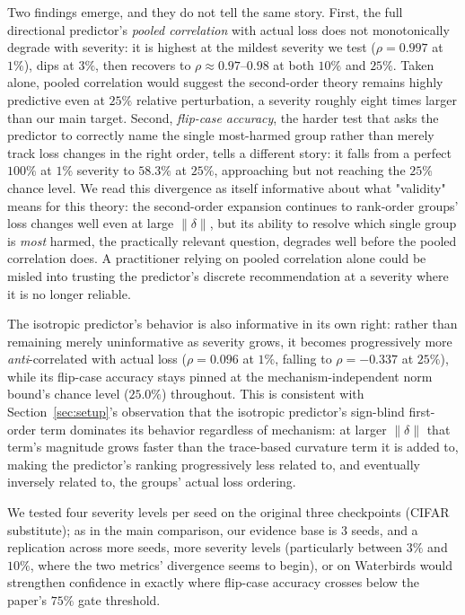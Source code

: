 \documentclass{article}
\begin{document}
Two findings emerge, and they do not tell the same story. First, the full directional predictor's \emph{pooled correlation} with actual loss does not monotonically degrade with severity: it is highest at the mildest severity we test ($\rho=0.997$ at $1\%$), dips at $3\%$, then recovers to $\rho\approx0.97$--$0.98$ at both $10\%$ and $25\%$. Taken alone, pooled correlation would suggest the second-order theory remains highly predictive even at $25\%$ relative perturbation, a severity roughly eight times larger than our main target. Second, \emph{flip-case accuracy}, the harder test that asks the predictor to correctly name the single most-harmed group rather than merely track loss changes in the right order, tells a different story: it falls from a perfect $100\%$ at $1\%$ severity to $58.3\%$ at $25\%$, approaching but not reaching the $25\%$ chance level. We read this divergence as itself informative about what "validity" means for this theory: the second-order expansion continues to rank-order groups' loss changes well even at large $\|\delta\|$, but its ability to resolve which single group is \emph{most} harmed, the practically relevant question, degrades well before the pooled correlation does. A practitioner relying on pooled correlation alone could be misled into trusting the predictor's discrete recommendation at a severity where it is no longer reliable.

The isotropic predictor's behavior is also informative in its own right: rather than remaining merely uninformative as severity grows, it becomes progressively more \emph{anti}-correlated with actual loss ($\rho=0.096$ at $1\%$, falling to $\rho=-0.337$ at $25\%$), while its flip-case accuracy stays pinned at the mechanism-independent norm bound's chance level ($25.0\%$) throughout. This is consistent with Section~\ref{sec:setup}'s observation that the isotropic predictor's sign-blind first-order term dominates its behavior regardless of mechanism: at larger $\|\delta\|$ that term's magnitude grows faster than the trace-based curvature term it is added to, making the predictor's ranking progressively less related to, and eventually inversely related to, the groups' actual loss ordering.

We tested four severity levels per seed on the original three checkpoints (CIFAR substitute); as in the main comparison, our evidence base is $3$ seeds, and a replication across more seeds, more severity levels (particularly between $3\%$ and $10\%$, where the two metrics' divergence seems to begin), or on Waterbirds would strengthen confidence in exactly where flip-case accuracy crosses below the paper's $75\%$ gate threshold.
\end{document}

